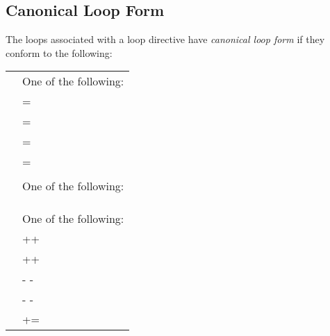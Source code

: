 \subsection{Canonical Loop Form}
\label{subsec:Canonical Loop Form}
\begin{ccppspecific}
The loops associated with a loop directive have \emph{canonical loop form} if
they conform to the following:

\medskip
\nolinenumbers
\renewcommand{\arraystretch}{1.0}
\tablelasttail{\hline}
\begin{supertabular}{ p{0.8in} p{4.5in}}
    {} & One of the following:\\
    & {} = {}\\
    & {} {} = {}\\
    & {} {} = {}\\
    & {} {} = {}\\
    & \\
    {} & One of the following:\\
    & {} {} {}\\
    & {} {} {}\\
    & \\
    {} & One of the following:\\
    & ++{}\\
    & {}++\\
    & {-} {-} {}\\
    & {} {-} {-}\\
    & {} += {}\\

\end{supertabular}
\end{ccppspecific}

